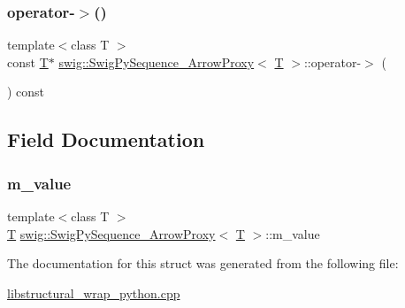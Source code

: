 \subsubsection{\texorpdfstring{operator-\/$>$()}{operator->()}}
{\footnotesize\ttfamily template$<$class T $>$ \\
const \hyperlink{fmt_8h_a0acb682b8260ab1c60b918599864e2e5}{T}$\ast$ \hyperlink{structswig_1_1_swig_py_sequence___arrow_proxy}{swig\+::\+Swig\+Py\+Sequence\+\_\+\+Arrow\+Proxy}$<$ \hyperlink{fmt_8h_a0acb682b8260ab1c60b918599864e2e5}{T} $>$\+::operator-\/$>$ (\begin{DoxyParamCaption}{ }\end{DoxyParamCaption}) const\hspace{0.3cm}{\ttfamily [inline]}}



\subsection{Field Documentation}
\mbox{\label{structswig_1_1_swig_py_sequence___arrow_proxy_a7e68416553925e7556e737325c324e0f}} 
\subsubsection{\texorpdfstring{m\+\_\+value}{m\_value}}
{\footnotesize\ttfamily template$<$class T $>$ \\
\hyperlink{fmt_8h_a0acb682b8260ab1c60b918599864e2e5}{T} \hyperlink{structswig_1_1_swig_py_sequence___arrow_proxy}{swig\+::\+Swig\+Py\+Sequence\+\_\+\+Arrow\+Proxy}$<$ \hyperlink{fmt_8h_a0acb682b8260ab1c60b918599864e2e5}{T} $>$\+::m\+\_\+value}



The documentation for this struct was generated from the following file\+:\begin{DoxyCompactItemize}
\item 
\hyperlink{libstructural__wrap__python_8cpp}{libstructural\+\_\+wrap\+\_\+python.\+cpp}\end{DoxyCompactItemize}
